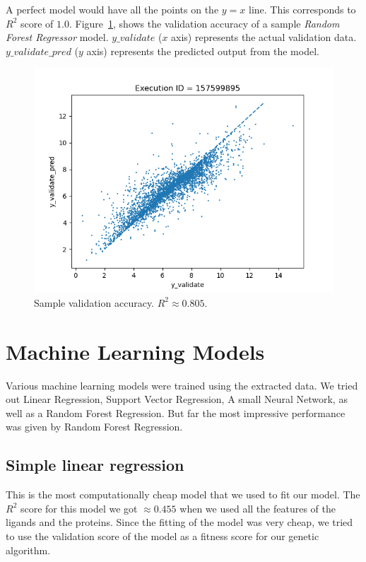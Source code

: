 \documentclass[11pt]{article}
\begin{document}
A perfect model would have all the points on the $y = x$ line.  This corresponds to $R^2$ score of $1.0$. 
Figure~\ref{fig:modelQualityVisualization},  shows the validation accuracy of a sample \textit{Random Forest Regressor} model.
$y\_validate$ ($x$ axis) represents the actual validation data.
$y\_validate\_pred$ ($y$ axis) represents the predicted output from the model.

\begin{figure}[htb]
  \centering
    \includegraphics[width=1.0\textwidth]{images/accuracy_validate}
    \caption{Sample validation accuracy.  $R^2 \approx 0.805$.}
    \label{fig:modelQualityVisualization}
\end{figure}


\section{Machine Learning Models}

Various machine learning models were trained using the extracted data.
We tried out Linear Regression,
Support Vector Regression,
A small Neural Network,
as well as a Random Forest Regression.
But far the most impressive performance was given by Random Forest Regression.

\subsection{Simple linear regression}
This is the most computationally cheap model that we used to fit our model.
The $R^2$ score for this model we got $\approx 0.455$ when we used all the
features of the ligands and the proteins.
Since the fitting of the model was very cheap, we tried to use the validation
score of the model as a fitness score for our genetic algorithm.
\end{document}
